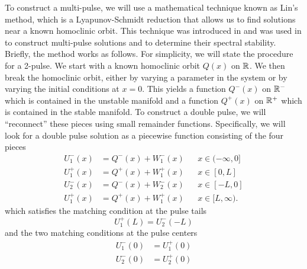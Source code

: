 \documentclass[thesis2.tex]{subfiles}
\begin{document}
To construct a multi-pulse, we will use a mathematical technique known as Lin's method, which is a Lyapunov-Schmidt reduction that allows us to find solutions near a known homoclinic orbit. This technique was introduced in \cite{Lin1990} and was used in \cite{Sandstede1993,SandstedeStrut} to construct multi-pulse solutions and \cite{Sandstede1998} to determine their spectral stability. Briefly, the method works as follows. For simplicity, we will state the procedure for a 2-pulse. We start with a known homoclinic orbit $Q(x)$ on $\mathbb{R}$. We then break the homoclinic orbit, either by varying a parameter in the system or by varying the initial conditions at $x = 0$. This yields a function $Q^-(x)$ on $\mathbb{R}^-$ which is contained in the unstable manifold and a function $Q^+(x)$ on $\mathbb{R}^+$ which is contained in the stable manifold. To construct a double pulse, we will ``reconnect'' these pieces using small remainder functions. Specifically, we will look for a double pulse solution as a piecewise function consisting of the four pieces
\begin{align*}
U_1^-(x) &= Q^-(x) + W_1^-(x) && x \in (-\infty, 0] \\
U_1^+(x) &= Q^+(x) + W_1^+(x) && x \in [0, L] \\
U_2^-(x) &= Q^-(x) + W_2^-(x) && x \in [-L, 0] \\
U_1^+(x) &= Q^+(x) + W_1^+(x) && x \in [L, \infty).
\end{align*}
which satisfies the matching condition at the pulse tails
\begin{equation}\label{introLin1}
U_1^+(L) = U_2^-(-L)
\end{equation} 
and the two matching conditions at the pulse centers
\begin{equation}\label{introLin2}
\begin{aligned}
U_1^-(0) &= U_1^+(0) \\
U_2^-(0) &= U_2^+(0)
\end{aligned}
\end{equation} 
\end{document}
